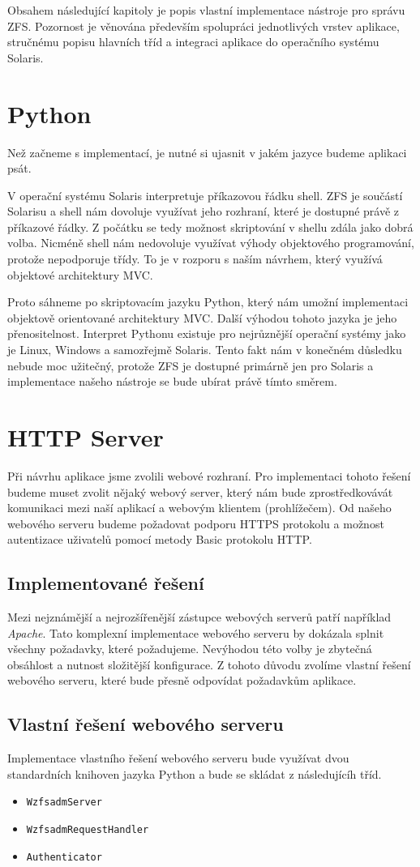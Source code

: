 Obsahem následující kapitoly je popis vla\-stní implementace nástroje pro sprá\-vu ZFS. Pozornost je věnována především spolupráci jednotlivých vrstev aplikace, stručnému popisu hlavních tříd a integraci aplikace do operačního systému Solaris.
\section{Python}
Než začneme s implementací, je nutné si ujasnit v jakém jazyce budeme aplikaci psát.

V operační systému Solaris interpretuje příkazovou řádku shell. ZFS je součástí Solarisu a shell nám dovoluje využívat jeho rozhraní, které je dostupné právě z příkazové řádky. Z počátku se tedy možnost skriptování v shellu zdála jako dobrá volba. Nicméně shell nám nedovoluje využívat výhody objektového programování, protože nepodporuje třídy. To je v rozporu s naším návrhem, který využívá objektové architektury MVC.

Proto sáhneme po skriptovacím jazyku Python, který nám umožní implementaci objektově orientované architektury MVC. Další výhodou tohoto jazyka je jeho přenositelnost. Interpret Pythonu existuje pro nejrůznější operační systémy jako je Linux, Windows a samozřejmě Solaris. Tento fakt nám v konečném důsledku nebude moc užitečný, protože ZFS je dostupné primárně jen pro Solaris a implementace našeho nástroje se bude ubírat právě tímto směrem.
\section{HTTP Server}
Při návrhu aplikace jsme zvolili webové rozhraní. Pro implementaci tohoto řešení budeme muset zvolit nějaký webový server, který nám bude zprostředkovávát komunikaci mezi naší aplikací a webovým klientem (prohlížečem). Od našeho webového serveru budeme požadovat podporu HTTPS protokolu a možnost autentizace uživatelů pomocí metody Basic protokolu HTTP.
    \subsection{Implementované řešení}
    Mezi nejznámější a nejrozšířenější zástupce webových serverů patří například \emph{Apache}. Tato komplexní implementace webového serveru by dokázala splnit všechny požadavky, které požadujeme. Nevýhodou této volby je zbytečná obsáhlost a nutnost složitější konfigurace. Z tohoto důvodu zvolíme vlastní řešení webového serveru, které bude přesně odpovídat požadavkům aplikace.
    \subsection{Vlastní řešení webového serveru}
    Implementace vlastního řešení webového serveru bude využívat dvou standardních knihoven jazyka Python a bude se skládat z následujícíh tříd.
    \begin{itemize}
      \item \verb|WzfsadmServer|
      \item \verb|WzfsadmRequestHandler|
      \item \verb|Authenticator|
    \end{itemize}

